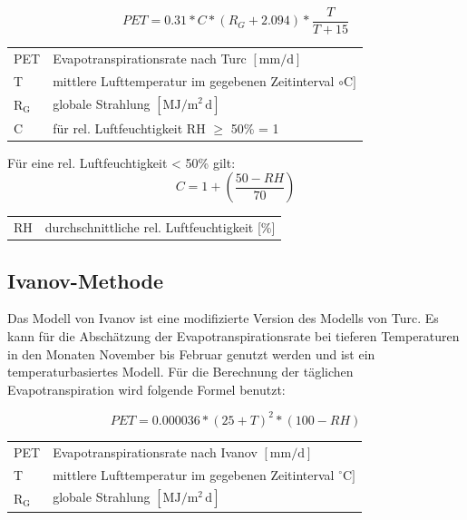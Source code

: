 \begin{equation}
\label{eq:turc}
PET=0.31*C*\left(R_G+2.094\right)*\frac{T}{T+15}
\end{equation}
\begin{table}[H]
\centering
\begin{tabular}{ll}
PET & Evapotranspirationsrate nach Turc  $\mathrm{[mm/d]}$\\
T & mittlere Lufttemperatur im gegebenen Zeitinterval $\mathrm{{\circ}C]}$\\
$\mathrm{R_G}$ & globale Strahlung $\mathrm{[MJ/m^2\,d]}$\\
C & für rel. Luftfeuchtigkeit RH $\geq$ 50\% = 1\\
\end{tabular}
\end{table}
Für eine rel. Luftfeuchtigkeit < 50\% gilt:
\begin{equation}
\label{eq:turc_c}
C=1+\left(\frac{50-RH}{70}\right)
\end{equation}
\begin{table}[H]
\centering
\begin{tabular}{ll}
RH& durchschnittliche rel. Luftfeuchtigkeit [\%]\\
\end{tabular}
\end{table}

\subsection{Ivanov-Methode}
Das Modell von Ivanov ist eine modifizierte Version des Modells von Turc. Es kann für die Abschätzung der Evapotranspirationsrate bei tieferen Temperaturen in den Monaten November bis Februar genutzt werden und ist ein temperaturbasiertes Modell. Für die Berechnung der täglichen Evapotranspiration wird folgende Formel benutzt:

\begin{equation}
\label{eq:ivanov_d}
PET=0.000036*(25+T)^2*(100-RH)
\end{equation}
\begin{table}[H]
\centering
\begin{tabular}{ll}
PET & Evapotranspirationsrate nach Ivanov  $\mathrm{[mm/d]}$\\
T & mittlere Lufttemperatur im gegebenen Zeitinterval $\mathrm{{^\circ}C]}$\\
$\mathrm{R_G}$ & globale Strahlung $\mathrm{[MJ/m^2\,d]}$\\
\end{tabular}
\end{table}

